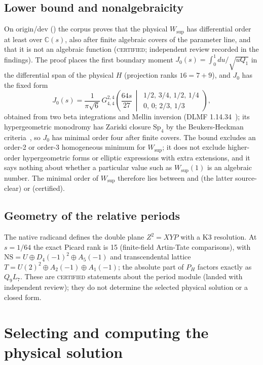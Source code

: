 \documentclass[aps,prd,onecolumn,amsmath,amssymb,longbibliography,floatfix,nofootinbib]{revtex4-2}
\newcommand{\Wsup}{W_{\mathrm{sup}}}
\newcommand{\st}[1]{\textsc{#1}}
\begin{document}
\subsection{Lower bound and nonalgebraicity}
On origin/dev () the corpus proves that the physical $\Wsup$ has differential order at least \SelectedLowerVal{} over $\mathbb{C}(s)$, also after finite algebraic covers of the parameter line, and that it is not an algebraic function (\st{certified}; independent review recorded in the findings). The proof places the first boundary moment $J_0(s)=\int_0^1du/\sqrt{uQ_1}$ in the differential span of the physical $H$ (projection ranks $16=7+9$), and $J_0$ has the fixed form
\begin{equation}
J_0(s)=\frac{1}{\pi\sqrt6}\,G^{2,4}_{4,4}\!\left(\frac{64s}{27}\,\middle|\,\begin{matrix}1/2,\,3/4,\,1/2,\,1/4\\ 0,\,0;\,2/3,\,1/3\end{matrix}\right),
\end{equation}
obtained from two beta integrations and Mellin inversion (DLMF 1.14.34~\cite{DLMF}); its hypergeometric monodromy has Zariski closure $\mathrm{Sp}_4$ by the Beukers-Heckman criteria~\cite{BeukersHeckman1989}, so $J_0$ has minimal order four after finite covers. The bound excludes an order-2 or order-3 homogeneous minimum for $\Wsup$; it does not exclude higher-order hypergeometric forms or elliptic expressions with extra extensions, and it says nothing about whether a particular value such as $\Wsup(1)$ is an algebraic number. The minimal order of $\Wsup$ therefore lies between \SelectedLowerVal{} and \OrderSeventeenVal{} (the latter source-clear) or \EnergyOrderVal{} (certified).

\subsection{Geometry of the relative periods}
The native radicand defines the double plane $Z^2=XYP$ with a K3 resolution. At $s=1/64$ the exact Picard rank is 15 (finite-field Artin-Tate comparisons), with $\mathrm{NS}=U\oplus D_4(-1)^2\oplus A_5(-1)$ and transcendental lattice $T=U(2)^2\oplus A_2(-1)\oplus A_1(-1)$; the absolute part of $P_H$ factors exactly as $Q_9L_7$. These are \st{certified} statements about the period module (landed with independent review); they do not determine the selected physical solution or a closed form.

\section{Selecting and computing the physical solution}
\label{sec:compute}
\end{document}
